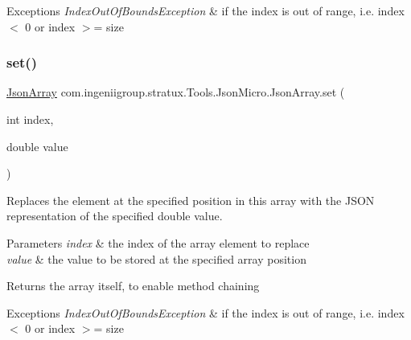 \begin{DoxyExceptions}{Exceptions}
{\em Index\+Out\+Of\+Bounds\+Exception} & if the index is out of range, i.\+e. {\ttfamily index $<$ 0} or {\ttfamily index $>$= size} \\
\hline
\end{DoxyExceptions}
\mbox{\label{classcom_1_1ingeniigroup_1_1stratux_1_1_tools_1_1_json_micro_1_1_json_array_a72760bec201a94f1d6f4021e4f34781b}} 
\subsubsection{\texorpdfstring{set()}{set()}\hspace{0.1cm}{\footnotesize\ttfamily [4/7]}}
{\footnotesize\ttfamily \hyperlink{classcom_1_1ingeniigroup_1_1stratux_1_1_tools_1_1_json_micro_1_1_json_array}{Json\+Array} com.\+ingeniigroup.\+stratux.\+Tools.\+Json\+Micro.\+Json\+Array.\+set (\begin{DoxyParamCaption}\item[{int}]{index,  }\item[{double}]{value }\end{DoxyParamCaption})}

Replaces the element at the specified position in this array with the J\+S\+ON representation of the specified {\ttfamily double} value.


\begin{DoxyParams}{Parameters}
{\em index} & the index of the array element to replace \\
\hline
{\em value} & the value to be stored at the specified array position \\
\hline
\end{DoxyParams}
\begin{DoxyReturn}{Returns}
the array itself, to enable method chaining 
\end{DoxyReturn}

\begin{DoxyExceptions}{Exceptions}
{\em Index\+Out\+Of\+Bounds\+Exception} & if the index is out of range, i.\+e. {\ttfamily index $<$ 0} or {\ttfamily index $>$= size} \\
\hline
\end{DoxyExceptions}
\mbox{\label{classcom_1_1ingeniigroup_1_1stratux_1_1_tools_1_1_json_micro_1_1_json_array_a96d6fb238e19ed02ec5dc4593886a29b}} 

